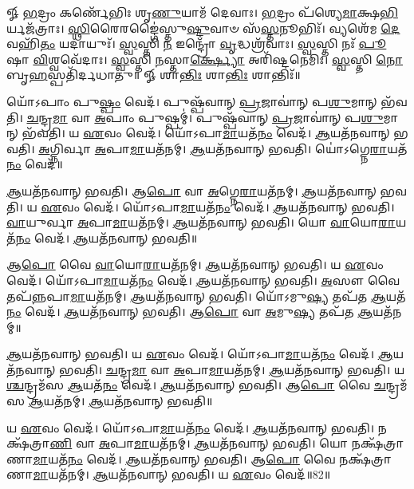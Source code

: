 


𑍐 \ul{𑌭}\-𑌦𑍍𑌰𑌂 𑌕𑌰𑍍𑌣𑍇᳴𑌭𑌿𑌃 𑌶𑍃\-\ul{𑌣𑍁}\-𑌯𑌾𑌮᳴ 𑌦𑍇𑌵𑌾𑌃। \ul{𑌭}\-𑌦𑍍𑌰𑌂 𑌪᳴𑌶𑍍𑌯𑍇\-\ul{𑌮𑌾}\-𑌕𑍍𑌷\-\ul{𑌭𑌿}\-𑌰𑍍𑌯𑌜᳴𑌤𑍍𑌰𑌾𑌃। 
\-\ul{𑌸𑍍𑌥𑌿}\-𑌰𑍈𑌰𑌙𑍍𑌗𑍈॑𑌸𑍍𑌤𑍁\-\ul{𑌷𑍍𑌟𑍁}\-𑌵𑌾𑍞 𑌸᳴\-\ul{𑌸𑍍𑌤}\-𑌨𑍂𑌭𑌿𑌃᳴। 𑌵𑍍𑌯𑌶𑍇᳴𑌮 \ul{𑌦𑍇}\-𑌵𑌹𑌿᳴\-\ul{𑌤𑌂} 𑌯𑌦𑌾𑌯𑍁𑌃᳴। 
\-\ul{𑌸𑍍𑌵}\-𑌸𑍍𑌤𑌿 \ul{𑌨} 𑌇𑌨𑍍𑌦𑍍𑌰𑍋᳴ \ul{𑌵𑍃}\-𑌦𑍍𑌧𑌶𑍍𑌰᳴𑌵𑌾𑌃। \ul{𑌸𑍍𑌵}\-𑌸𑍍𑌤𑌿 𑌨𑌃᳴ \ul{𑌪𑍂}\-𑌷𑌾 \ul{𑌵𑌿}\-𑌶𑍍𑌵𑌵𑍇᳴𑌦𑌾𑌃। 
\-\ul{𑌸𑍍𑌵}\-𑌸𑍍𑌤𑌿 \ul{𑌨}\-𑌸𑍍𑌤𑌾\-\ul{𑌰𑍍𑌕𑍍𑌷𑍍𑌯𑍋} 𑌅𑌰𑌿᳴𑌷𑍍𑌟𑌨𑍇𑌮𑌿𑌃। \ul{𑌸𑍍𑌵}\-𑌸𑍍𑌤𑌿 \ul{𑌨𑍋} 𑌬𑍃\-\ul{𑌹}\-𑌸𑍍𑌪𑌤𑌿᳴𑌰𑍍𑌦𑌧𑌾𑌤𑍁॥
𑍐 𑌶𑌾\-\ul{𑌨𑍍𑌤𑌿𑌃} 𑌶𑌾\-\ul{𑌨𑍍𑌤𑌿𑌃} 𑌶𑌾𑌨𑍍𑌤𑌿𑌃᳴॥


𑌯𑍋᳴𑌽𑌪𑌾𑌂 𑌪𑍁\-\ul{𑌷𑍍𑌪𑌂} 𑌵𑍇𑌦᳴। 𑌪𑍁𑌷𑍍𑌪᳴𑌵𑌾𑌨𑍍‌ \ul{𑌪𑍍𑌰}\-𑌜𑌾𑌵𑌾॑𑌨𑍍 𑌪\-\ul{𑌶𑍁}\-𑌮𑌾𑌨𑍍 𑌭᳴𑌵𑌤𑌿। 
\-\ul{𑌚}\-𑌨𑍍𑌦𑍍𑌰\-\ul{𑌮𑌾} 𑌵𑌾 \ul{𑌅}\-𑌪𑌾𑌂 𑌪𑍁𑌷𑍍𑌪𑌮𑍍॑। 𑌪𑍁𑌷𑍍𑌪᳴𑌵𑌾𑌨𑍍 \ul{𑌪𑍍𑌰}\-𑌜𑌾𑌵𑌾॑𑌨𑍍 𑌪\-\ul{𑌶𑍁}\-𑌮𑌾𑌨𑍍‌ 𑌭᳴𑌵𑌤𑌿। 
𑌯 \ul{𑌏}\-𑌵𑌂 𑌵𑍇𑌦᳴। 𑌯𑍋᳴𑌽𑌪𑌾\-\ul{𑌮𑌾}\-𑌯𑌤᳴\-\ul{𑌨𑌂} 𑌵𑍇𑌦᳴। 
\-\ul{𑌆}\-𑌯𑌤᳴𑌨𑌵𑌾𑌨𑍍‌ 𑌭𑌵𑌤𑌿। \ul{𑌅}\-𑌗𑍍𑌨𑌿𑌰𑍍𑌵𑌾 \ul{𑌅}\-𑌪𑌾\-\ul{𑌮𑌾}\-𑌯𑌤᳴𑌨𑌮𑍍। 
\-\ul{𑌆}\-𑌯𑌤᳴𑌨𑌵𑌾𑌨𑍍‌ 𑌭𑌵𑌤𑌿। 𑌯𑍋॑𑌽𑌗𑍍𑌨𑍇\-\ul{𑌰𑌾}\-𑌯𑌤᳴\-\ul{𑌨𑌂} 𑌵𑍇𑌦᳴॥


\-\ul{𑌆}\-𑌯𑌤᳴𑌨𑌵𑌾𑌨𑍍‌ 𑌭𑌵𑌤𑌿। 𑌆\-\ul{𑌪𑍋} 𑌵𑌾 \ul{𑌅}\-𑌗𑍍𑌨𑍇\-\ul{𑌰𑌾}\-𑌯𑌤᳴𑌨𑌮𑍍‌। 
\-\ul{𑌆}\-𑌯𑌤᳴𑌨𑌵𑌾𑌨𑍍‌ 𑌭𑌵𑌤𑌿। 𑌯 \ul{𑌏}\-𑌵𑌂 𑌵𑍇𑌦᳴। 
𑌯𑍋᳴𑌽𑌪𑌾\-\ul{𑌮𑌾}\-𑌯𑌤᳴\-\ul{𑌨𑌂} 𑌵𑍇𑌦᳴। \ul{𑌆}\-𑌯𑌤᳴𑌨𑌵𑌾𑌨𑍍‌ 𑌭𑌵𑌤𑌿। 
\-\ul{𑌵𑌾}\-𑌯𑍁𑌰𑍍𑌵𑌾 \ul{𑌅}\-𑌪𑌾\-\ul{𑌮𑌾}\-𑌯𑌤᳴𑌨𑌮𑍍। \ul{𑌆}\-𑌯𑌤᳴𑌨𑌵𑌾𑌨𑍍‌ 𑌭𑌵𑌤𑌿। 
𑌯𑍋 \ul{𑌵𑌾}\-𑌯𑍋\-\ul{𑌰𑌾}\-𑌯𑌤᳴\-\ul{𑌨𑌂} 𑌵𑍇𑌦᳴। \ul{𑌆}\-𑌯𑌤᳴𑌨𑌵𑌾𑌨𑍍‌ 𑌭𑌵𑌤𑌿॥


𑌆\-\ul{𑌪𑍋} 𑌵𑍈 \ul{𑌵𑌾}\-𑌯𑍋\-\ul{𑌰𑌾}\-𑌯𑌤᳴𑌨𑌮𑍍। \ul{𑌆}\-𑌯𑌤᳴𑌨𑌵𑌾𑌨𑍍‌ 𑌭𑌵𑌤𑌿। 
𑌯 \ul{𑌏}\-𑌵𑌂 𑌵𑍇𑌦᳴। 𑌯𑍋᳴𑌽𑌪𑌾\-\ul{𑌮𑌾}\-𑌯𑌤᳴\-\ul{𑌨𑌂} 𑌵𑍇𑌦᳴। 
\-\ul{𑌆}\-𑌯𑌤᳴𑌨𑌵𑌾𑌨𑍍‌ 𑌭𑌵𑌤𑌿। \ul{𑌅}\-𑌸𑍗 𑌵𑍈 𑌤𑌪᳴\-\ul{𑌨𑍍𑌨}\-𑌪𑌾\-\ul{𑌮𑌾}\-𑌯𑌤᳴𑌨𑌮𑍍। 
\-\ul{𑌆}\-𑌯𑌤᳴𑌨𑌵𑌾𑌨𑍍‌ 𑌭𑌵𑌤𑌿। 𑌯𑍋᳴𑌽𑌮𑍁\-\ul{𑌷𑍍𑌯} 𑌤𑌪᳴𑌤 \ul{𑌆}\-𑌯𑌤᳴\-\ul{𑌨𑌂} 𑌵𑍇𑌦᳴। 
\-\ul{𑌆}\-𑌯𑌤᳴𑌨𑌵𑌾𑌨𑍍‌ 𑌭𑌵𑌤𑌿। 𑌆\-\ul{𑌪𑍋} 𑌵𑌾 \ul{𑌅}\-𑌮𑍁\-\ul{𑌷𑍍𑌯} 𑌤𑌪᳴𑌤 \ul{𑌆}\-𑌯𑌤᳴𑌨𑌮𑍍॥



\-\ul{𑌆}\-𑌯𑌤᳴𑌨𑌵𑌾𑌨𑍍‌ 𑌭𑌵𑌤𑌿। 𑌯 \ul{𑌏}\-𑌵𑌂 𑌵𑍇𑌦᳴। 
𑌯𑍋᳴𑌽𑌪𑌾\-\ul{𑌮𑌾}\-𑌯𑌤᳴\-\ul{𑌨𑌂} 𑌵𑍇𑌦᳴। \ul{𑌆}\-𑌯𑌤᳴𑌨𑌵𑌾𑌨𑍍‌ 𑌭𑌵𑌤𑌿। 
\-\ul{𑌚}\-𑌨𑍍𑌦𑍍𑌰\-\ul{𑌮𑌾} 𑌵𑌾 \ul{𑌅}\-𑌪𑌾\-\ul{𑌮𑌾}\-𑌯𑌤᳴𑌨𑌮𑍍‌। \ul{𑌆}\-𑌯𑌤᳴𑌨𑌵𑌾𑌨𑍍‌ 𑌭𑌵𑌤𑌿। 
𑌯\-\ul{𑌶𑍍𑌚}\-𑌨𑍍𑌦𑍍𑌰𑌮᳴𑌸 \ul{𑌆}\-𑌯𑌤᳴\-\ul{𑌨𑌂} 𑌵𑍇𑌦᳴। \ul{𑌆}\-𑌯𑌤᳴𑌨𑌵𑌾𑌨𑍍‌ 𑌭𑌵𑌤𑌿। 
𑌆\-\ul{𑌪𑍋} 𑌵𑍈 \ul{𑌚}\-𑌨𑍍𑌦𑍍𑌰𑌮᳴𑌸 \ul{𑌆}\-𑌯𑌤᳴𑌨𑌮𑍍। \ul{𑌆}\-𑌯𑌤᳴𑌨𑌵𑌾𑌨𑍍‌ 𑌭𑌵𑌤𑌿॥



𑌯 \ul{𑌏}\-𑌵𑌂 𑌵𑍇𑌦᳴। 𑌯𑍋᳴𑌽𑌪𑌾\-\ul{𑌮𑌾}\-𑌯𑌤᳴\-\ul{𑌨𑌂} 𑌵𑍇𑌦᳴। 
\-\ul{𑌆}\-𑌯𑌤᳴𑌨𑌵𑌾𑌨𑍍‌ 𑌭𑌵𑌤𑌿। 𑌨𑌕𑍍𑌷᳴𑌤𑍍𑌰𑌾\-\ul{𑌣𑌿} 𑌵𑌾 \ul{𑌅}\-𑌪𑌾\-\ul{𑌮𑌾}\-𑌯𑌤᳴𑌨𑌮𑍍। 
\-\ul{𑌆}\-𑌯𑌤᳴𑌨𑌵𑌾𑌨𑍍‌ 𑌭𑌵𑌤𑌿। 𑌯𑍋 𑌨𑌕𑍍𑌷᳴𑌤𑍍𑌰𑌾𑌣𑌾\-\ul{𑌮𑌾}\-𑌯𑌤᳴\-\ul{𑌨𑌂} 𑌵𑍇𑌦᳴। 
\-\ul{𑌆}\-𑌯𑌤᳴𑌨𑌵𑌾𑌨𑍍‌ 𑌭𑌵𑌤𑌿। 𑌆\-\ul{𑌪𑍋} 𑌵𑍈 𑌨𑌕𑍍𑌷᳴𑌤𑍍𑌰𑌾𑌣𑌾\-\ul{𑌮𑌾}\-𑌯𑌤᳴𑌨𑌮𑍍। 
\-\ul{𑌆}\-𑌯𑌤᳴𑌨𑌵𑌾𑌨𑍍‌ 𑌭𑌵𑌤𑌿। 𑌯 \ul{𑌏}\-𑌵𑌂 𑌵𑍇𑌦᳴॥82॥


